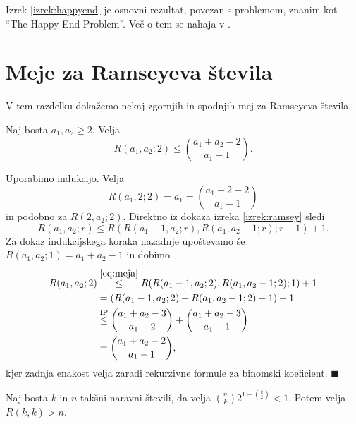 \documentclass[twoside,11pt]{article}
\begin{document}
Izrek \ref{izrek:happyend} je osnovni rezultat, povezan s problemom, znanim 
kot "`The Happy End Problem"'. Več o tem se nahaja v \cite[poglavje 29]{color}.

\section{Meje za Ramseyeva števila}

\hspace{\parindent}V tem razdelku dokažemo nekaj zgornjih in spodnjih mej za Ramseyeva števila.

\begin{trditev}
    Naj bosta $a_1,a_2 \ge 2$. Velja
    \[
        R(a_1, a_2; 2) \le \binom{a_1 + a_2 -2}{a_1-1}.
    \]
\end{trditev}

\begin{dokaz}
    Uporabimo indukcijo. Velja
    \[
        R(a_1, 2; 2) = a_1 = \binom{a_1+2-2}{a_1-1}
    \]
    in podobno za $R(2,a_2; 2)$. Direktno iz dokaza 
    izreka \ref{izrek:ramsey} sledi
    \begin{equation}
        R(a_1, a_2; r) \le R(R(a_1-1,a_2;r), R(a_1,a_2-1;r);r-1) + 1.
        \label{eq:meja}
    \end{equation}
    Za dokaz indukcijskega koraka nazadnje upoštevamo še $R(a_1,a_2;1) = a_1 + a_2 - 1$ in dobimo
    \begin{align*}
        R(a_1, a_2; 2) &\overset{\eqref{eq:meja}}{\le} R(R(a_1-1,a_2;2), R(a_1,a_2-1;2);1) +1\\
        &= (R(a_1-1,a_2;2) + R(a_1,a_2-1; 2) - 1) + 1 \\
        &\overset{{\text{IP}}}{\le} \binom{a_1 + a_2 -3}{a_1-2} + \binom{a_1 + a_2 -3}{a_1-1} \\
        &=\binom{a_1+a_2-2}{a_1-1},
    \end{align*}
    kjer zadnja enakost velja zaradi rekurzivne formule za binomski koeficient. \hfill $\blacksquare$
\end{dokaz} 

\begin{izrek}
    Naj bosta $k$ in $n$ takšni naravni števili, da velja 
    $\binom{n}{k}2^{1-\binom{k}{2}} < 1$. Potem velja 
    $R(k,k) > n$.
\end{izrek}
\end{document}
